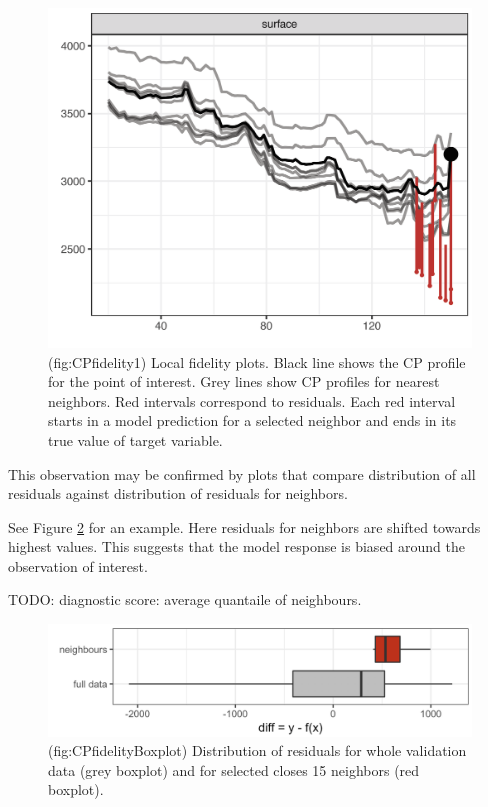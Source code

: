 \documentclass[]{krantz}
\theoremstyle{definition}
\theoremstyle{definition}
\theoremstyle{definition}
\theoremstyle{remark}
\begin{document}
\begin{figure}

{\centering \includegraphics[width=0.7\linewidth]{figure/cp_fidelity_1} 

}

\caption{(fig:CPfidelity1) Local fidelity plots. Black line shows the CP profile for the point of interest. Grey lines show CP profiles for nearest neighbors. Red intervals correspond to residuals. Each red interval starts in a model prediction for a selected neighbor and ends in its true value of target variable.}\label{fig:CPfidelity1}
\end{figure}

This observation may be confirmed by plots that compare distribution of
all residuals against distribution of residuals for neighbors.

See Figure \ref{fig:CPfidelityBoxplot} for an example. Here residuals
for neighbors are shifted towards highest values. This suggests that the
model response is biased around the observation of interest.

TODO: diagnostic score: average quantaile of neighbours.

\begin{figure}

{\centering \includegraphics[width=0.7\linewidth]{figure/cp_fidelity_boxplot} 

}

\caption{(fig:CPfidelityBoxplot) Distribution of residuals for whole validation data (grey boxplot) and for selected closes 15 neighbors (red boxplot).}\label{fig:CPfidelityBoxplot}
\end{figure}
\end{document}
